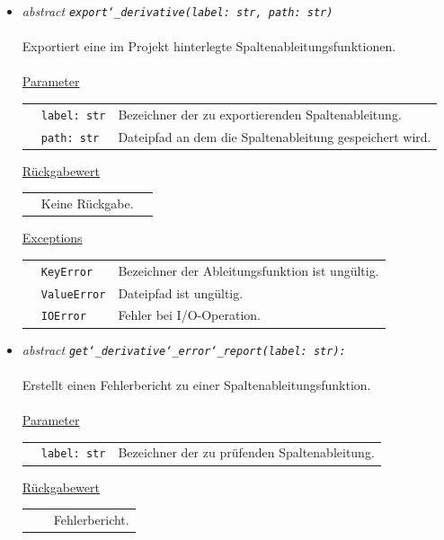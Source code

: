 \documentclass{article}
\newcommand{\classref}[1]{\texttt{\nameref{cls:#1}}}
\begin{document}
\begin{itemize}
\item \textit{\flqq{}abstract\frqq} \texttt{\textit{export\char`_derivative(label: str, path: str)}}\\\\
Exportiert eine im Projekt hinterlegte Spaltenableitungsfunktionen.
\\\\
\underline{Parameter}\\
\begin{tabular}{lll}
 & \texttt{label: str} & Bezeichner der zu exportierenden Spaltenableitung.\\
 & \texttt{path: str} & Dateipfad an dem die Spaltenableitung gespeichert wird.\\
\end{tabular}

\underline{Rückgabewert}\\
\begin{tabular}{lll}
 & Keine Rückgabe.\\
\end{tabular}

\underline{Exceptions}\\
\begin{tabular}{lll}
 & \texttt{KeyError} & Bezeichner der Ableitungsfunktion ist ungültig.\\
 & \texttt{ValueError} & Dateipfad ist ungültig.\\
 & \texttt{IOError} & Fehler bei I/O-Operation.\\
\end{tabular}


\item \textit{\flqq{}abstract\frqq} \texttt{\textit{get\char`_derivative\char`_error\char`_report(label: str): \classref{ErrorReport}}}\\\\
Erstellt einen Fehlerbericht zu einer Spaltenableitungsfunktion.
\\\\
\underline{Parameter}\\
\begin{tabular}{lll}
 & \texttt{label: str} & Bezeichner der zu prüfenden Spaltenableitung.\\
\end{tabular}

\underline{Rückgabewert}\\
\begin{tabular}{lll}
 & \classref{ErrorReport} & Fehlerbericht.\\
\end{tabular}


\end{itemize}
\end{document}
